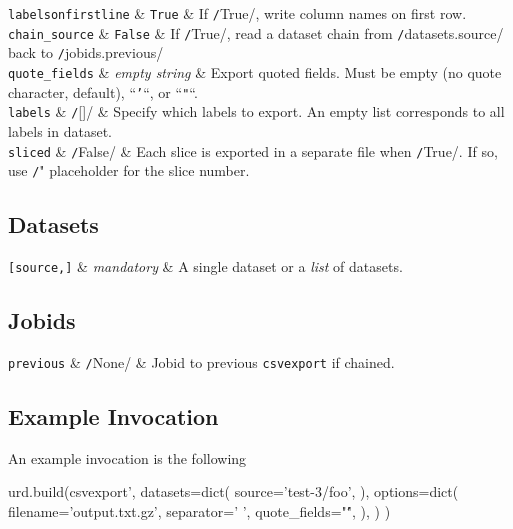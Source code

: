   \RP \texttt{labelsonfirstline} & \texttt{True} & If
  \texttt/True/, write column names on first row.\\[1ex]
  
  \RP \texttt{chain\_source} & \texttt{False} & If
  \texttt/True/, read a dataset chain from
  \texttt/datasets.source/ back to
  \texttt/jobids.previous/\\[1ex]

  \RP \texttt{quote\_fields} & \textsl{empty string} & Export quoted fields.  Must be empty
  (no quote character, default), ``\texttt{'}``, or ``\texttt{"}``.\\[1ex]
  
  \RP \texttt{labels} & \texttt/[]/ & Specify which labels to
  export.  An empty list corresponds to all labels in dataset.\\[1ex]
  
  \RP \texttt{sliced} & \texttt/False/ & Each slice is
  exported in a separate file when \texttt/True/.  If so,
  use \texttt/"%
  placeholder for the slice number.\\[1ex]
\stoptable

\subsection*{Datasets}
\starttable
  \RP \texttt{[source,]} & \textsl{mandatory} & A single
  dataset or a \textsl{list} of datasets.\\[1ex]
\stoptable


\subsection*{Jobids}
\starttable
  \texttt{previous} & \texttt/None/ & Jobid to
  previous \texttt{csvexport} if chained.\\[1ex]
\stoptable




\subsection{Example Invocation}
An example invocation is the following

\begin{python}
urd.build(csvexport',
    datasets=dict(
        source='test-3/foo',
    ),
    options=dict(
        filename='output.txt.gz',
        separator=' ',
        quote_fields="\'",
        ),
    )
)
\end{python}












